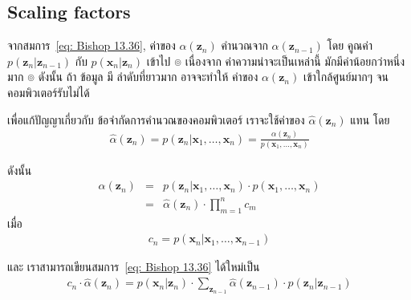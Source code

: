 
\subsection{Scaling factors}

จากสมการ~\ref{eq: Bishop 13.36}, ค่าของ $\alpha(\textbf{z}_n)$ คำนวณจาก $\alpha(\textbf{z}_{n-1})$ โดย คูณค่า $p(\textbf{z}_n|\textbf{z}_{n-1})$ กับ $p(\textbf{x}_n|\textbf{z}_n)$ เข้าไป
๏ เนื่องจาก ค่าความน่าจะเป็นเหล่านี้ มักมีค่าน้อยกว่าหนึ่งมาก
๏ ดังนั้น ถ้า ข้อมูล มี ลำดับที่ยาวมาก อาจจะทำให้ ค่าของ $\alpha(\textbf{z}_n)$ เข้าใกล้ศูนย์มากๆ จนคอมพิวเตอร์รับไม่ได้

เพื่อแก้ปัญญาเกี่ยวกับ ข้อจำกัดการคำนวณของคอมพิวเตอร์ เราจะใช้ค่าของ $\hat{\alpha}(\textbf{z}_n)$ แทน โดย
\begin{eqnarray}
\hat{\alpha}(\textbf{z}_n) = p(\textbf{z}_n|\textbf{x}_1, \ldots, \textbf{x}_n) = \frac{\alpha(\textbf{z}_n)}{p(\textbf{x}_1, \ldots, \textbf{x}_n)}
\label{eq: Bishop 13.55}
\end{eqnarray}

ดังนั้น
\begin{eqnarray}
\alpha(\textbf{z}_n) 
&=& p(\textbf{z}_n|\textbf{x}_1, \ldots, \textbf{x}_n) \cdot p(\textbf{x}_1, \ldots, \textbf{x}_n)
\nonumber \\
&=& \hat{\alpha}(\textbf{z}_n) \cdot \prod_{m=1}^n c_m
\label{eq: Bishop 13.58}
\end{eqnarray}
เมื่อ
\begin{eqnarray}
c_n = p(\textbf{x}_n|\textbf{x}_1, \ldots, \textbf{x}_{n-1})
\label{eq: Bishop 13.56}
\end{eqnarray}

และ เราสามารถเขียนสมการ~\ref{eq: Bishop 13.36} ได้ใหม่เป็น
\begin{eqnarray}
c_n \cdot \hat{\alpha}(\textbf{z}_n) =
p(\textbf{x}_n|\textbf{z}_n) \cdot \sum_{\textbf{z}_{n-1}} \hat{\alpha}(\textbf{z}_{n-1}) \cdot p(\textbf{z}_n|\textbf{z}_{n-1})
\label{eq: Bishop 13.59}
\end{eqnarray}

